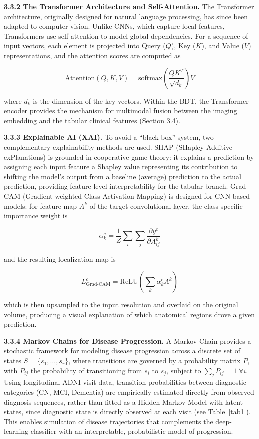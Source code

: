 \documentclass[pdflatex,sn-mathphys-num]{sn-jnl}%
\theoremstyle{thmstyleone}%
\theoremstyle{thmstyletwo}%
\theoremstyle{thmstylethree}%
\begin{document}
\textbf{3.3.2 The Transformer Architecture and Self-Attention.} The Transformer architecture, originally designed for natural language processing, has since been adapted to computer vision. Unlike CNNs, which capture local features, Transformers use self-attention to model global dependencies. For a sequence of input vectors, each element is projected into Query ($Q$), Key ($K$), and Value ($V$) representations, and the attention scores are computed as

\begin{equation}
\mathrm{Attention}(Q, K, V) = \mathrm{softmax}\!\left(\frac{QK^{T}}{\sqrt{d_k}}\right) V
\label{eq2}
\end{equation}

where $d_k$ is the dimension of the key vectors. Within the BDT, the Transformer encoder provides the mechanism for multimodal fusion between the imaging embedding and the tabular clinical features (Section 3.4).

\textbf{3.3.3 Explainable AI (XAI).} To avoid a ``black-box'' system, two complementary explainability methods are used. SHAP (SHapley Additive exPlanations) \cite{bib31} is grounded in cooperative game theory: it explains a prediction by assigning each input feature a Shapley value representing its contribution to shifting the model's output from a baseline (average) prediction to the actual prediction, providing feature-level interpretability for the tabular branch. Grad-CAM (Gradient-weighted Class Activation Mapping) is designed for CNN-based models: for feature map $A^k$ of the target convolutional layer, the class-specific importance weight is

\begin{equation}
\alpha_k^{c} = \frac{1}{Z} \sum_i \sum_j \frac{\partial y^{c}}{\partial A_{ij}^{k}}
\label{eq3}
\end{equation}

and the resulting localization map is

\begin{equation}
L^{c}_{\mathrm{Grad\text{-}CAM}} = \mathrm{ReLU}\!\left(\sum_k \alpha_k^{c} A^{k}\right)
\label{eq4}
\end{equation}

which is then upsampled to the input resolution and overlaid on the original volume, producing a visual explanation of which anatomical regions drove a given prediction.

\textbf{3.3.4 Markov Chains for Disease Progression.} A Markov Chain provides a stochastic framework for modeling disease progression across a discrete set of states $S = \{s_1, \ldots, s_r\}$, where transitions are governed by a probability matrix $P$, with $P_{ij}$ the probability of transitioning from $s_i$ to $s_j$, subject to $\sum_j P_{ij} = 1\;\forall i$. Using longitudinal ADNI visit data, transition probabilities between diagnostic categories (CN, MCI, Dementia) are empirically estimated directly from observed diagnosis sequences, rather than fitted as a Hidden Markov Model with latent states, since diagnostic state is directly observed at each visit (see Table~\ref{tab1}). This enables simulation of disease trajectories that complements the deep-learning classifier with an interpretable, probabilistic model of progression.
\end{document}
